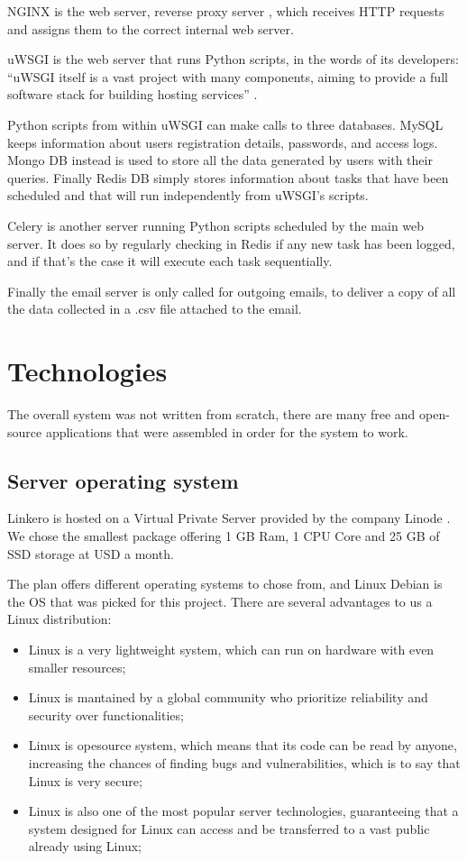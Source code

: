 NGINX is the web server, reverse proxy server \cite{WikiNginx}, which receives
HTTP requests and assigns them to the correct internal web server.

uWSGI is the web server that runs Python scripts, in the words of its
developers: ``uWSGI itself is a vast project with many components, aiming to
provide a full software stack for building hosting services'' \cite{RtduWsgi}.

Python scripts from within uWSGI can make calls to three databases. MySQL keeps
information about users registration details, passwords, and access logs. Mongo
DB instead is used to store all the data generated by users with their queries.
Finally Redis DB simply stores information about tasks that have been scheduled
and that will run independently from uWSGI's scripts.

Celery is another server running Python scripts scheduled by the main web
server. It does so by regularly checking in Redis if any new task has been
logged, and if that's the case it will execute each task sequentially.

Finally the email server is only called for outgoing emails, to deliver a copy
of all the data collected in a .csv file attached to the email.

\section{Technologies}

The overall system was not written from scratch, there are many free and
open-source applications that were assembled in order for the system to work.

\subsection{Server operating system}
Linkero is hosted on a Virtual Private Server provided by the company Linode
\texttrademark. We chose the smallest package offering 1 GB Ram, 1 CPU Core and
25 GB of SSD storage at  USD a month.

The plan offers different operating systems to chose from, and Linux Debian is
the OS that was picked for this project. There are several advantages to us a
Linux distribution:
\begin{itemize}
  \item Linux is a very lightweight system, which can run on hardware with even
  smaller resources;
  \item Linux is mantained by a global community who prioritize reliability and
  security over functionalities;
  \item Linux is opesource system, which means that its code can be read by
  anyone, increasing the chances of finding bugs and vulnerabilities, which is
  to say that Linux is very secure;
  \item Linux is also one of the most popular server technologies, guaranteeing
  that a system designed for Linux can access and be transferred to a vast
  public already using Linux;
\end{itemize}

